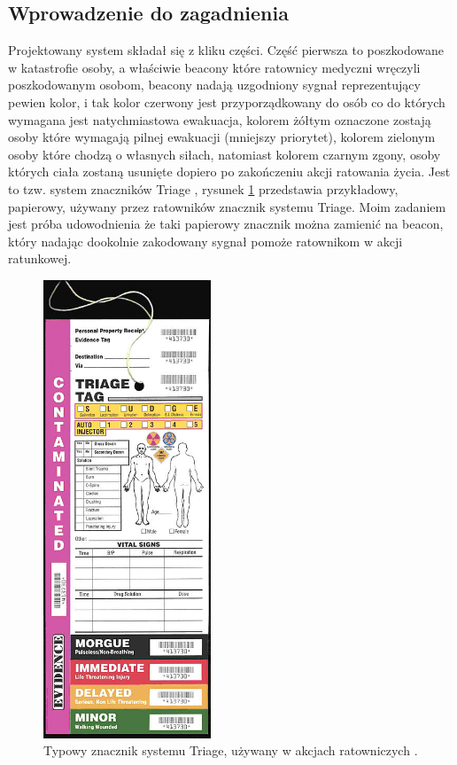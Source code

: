 \subsection{Wprowadzenie do zagadnienia}

Projektowany system składał się z kliku części. Część pierwsza to poszkodowane w katastrofie osoby, a właściwie beacony które ratownicy medyczni wręczyli poszkodowanym osobom, beacony nadają uzgodniony sygnał reprezentujący pewien kolor, i tak kolor czerwony jest przyporządkowany do osób co do których wymagana jest natychmiastowa ewakuacja, kolorem żółtym oznaczone zostają osoby które wymagają pilnej ewakuacji (mniejszy priorytet), kolorem zielonym osoby które chodzą o własnych siłach, natomiast kolorem czarnym zgony, osoby których ciała zostaną usunięte dopiero po zakończeniu akcji ratowania życia. Jest to tzw. system znaczników Triage \cite{triage}, rysunek \ref{fig:triage} przedstawia przykładowy, papierowy, używany przez ratowników znacznik systemu Triage. Moim zadaniem jest próba udowodnienia że taki papierowy znacznik można zamienić na beacon, który nadając dookolnie zakodowany sygnał pomoże ratownikom w akcji ratunkowej.

\begin{figure}[!th]
    \centering
    \includegraphics[width=5cm]{zalaczniki/obrazy/triage_tag.jpg}
    \caption{Typowy znacznik systemu Triage, używany w akcjach ratowniczych \cite{triage}.}
    \label{fig:triage}
\end{figure}

